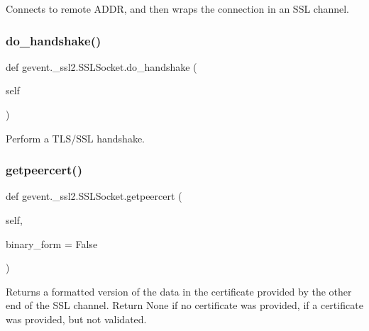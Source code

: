 \begin{DoxyVerb}Connects to remote ADDR, and then wraps the connection in
an SSL channel.\end{DoxyVerb}
 \mbox{\label{classgevent_1_1__ssl2_1_1_s_s_l_socket_a43730cc2ec5f130dc6e1ebd8aeb77426}} 
\subsubsection{\texorpdfstring{do\+\_\+handshake()}{do\_handshake()}}
{\footnotesize\ttfamily def gevent.\+\_\+ssl2.\+S\+S\+L\+Socket.\+do\+\_\+handshake (\begin{DoxyParamCaption}\item[{}]{self }\end{DoxyParamCaption})}

\begin{DoxyVerb}Perform a TLS/SSL handshake.\end{DoxyVerb}
 \mbox{\label{classgevent_1_1__ssl2_1_1_s_s_l_socket_a0630f2d9816fffb0da4d8f1a4831127c}} 
\subsubsection{\texorpdfstring{getpeercert()}{getpeercert()}}
{\footnotesize\ttfamily def gevent.\+\_\+ssl2.\+S\+S\+L\+Socket.\+getpeercert (\begin{DoxyParamCaption}\item[{}]{self,  }\item[{}]{binary\+\_\+form = {\ttfamily False} }\end{DoxyParamCaption})}

\begin{DoxyVerb}Returns a formatted version of the data in the
certificate provided by the other end of the SSL channel.
Return None if no certificate was provided, {} if a
certificate was provided, but not validated.\end{DoxyVerb}
 \mbox{\label{classgevent_1_1__ssl2_1_1_s_s_l_socket_afbb485141d0319326f358c63e17ab8f8}} 
